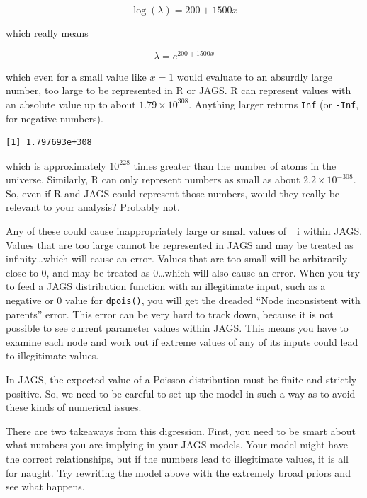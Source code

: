 \documentclass[
  13,
  letterpaper,
]{report}
\newenvironment{Shaded}{\begin{snugshade}}{\end{snugshade}}
\newcommand{\NormalTok}[1]{\textcolor[rgb]{0.00,0.23,0.31}{#1}}
\newcommand{\SpecialCharTok}[1]{\textcolor[rgb]{0.37,0.37,0.37}{#1}}
\begin{document}
\[\log{\left(\lambda\right)}=200+1500x\]

which really means

\[\lambda=e^{200+1500x}\]

which even for a small value like \(x=1\) would evaluate to an absurdly
large number, too large to be represented in R or JAGS. R can represent
values with an absolute value up to about \(1.79\times10^{308}\).
Anything larger returns \texttt{Inf} (or \texttt{-Inf}, for negative
numbers).

\begin{Shaded}
\end{Shaded}

\begin{verbatim}
[1] 1.797693e+308
\end{verbatim}

which is approximately \(10^{228}\) times greater than the number of
atoms in the universe. Similarly, R can only represent numbers as small
as about \(2.2\times10^{-308}\). So, even if R and JAGS could represent
those numbers, would they really be relevant to your analysis? Probably
not.

Any of these could cause inappropriately large or small values of
\lambda\_i within JAGS. Values that are too large cannot be represented
in JAGS and may be treated as infinity\ldots which will cause an error.
Values that are too small will be arbitrarily close to 0, and may be
treated as 0\ldots which will also cause an error. When you try to feed
a JAGS distribution function with an illegitimate input, such as a
negative or 0 value for \texttt{dpois()}, you will get the dreaded
``Node inconsistent with parents'' error. This error can be very hard to
track down, because it is not possible to see current parameter values
within JAGS. This means you have to examine each node and work out if
extreme values of any of its inputs could lead to illegitimate values.

In JAGS, the expected value of a Poisson distribution must be finite and
strictly positive. So, we need to be careful to set up the model in such
a way as to avoid these kinds of numerical issues.

There are two takeaways from this digression. First, you need to be
smart about what numbers you are implying in your JAGS models. Your
model might have the correct relationships, but if the numbers lead to
illegitimate values, it is all for naught. Try rewriting the model above
with the extremely broad priors and see what happens.
\end{document}
